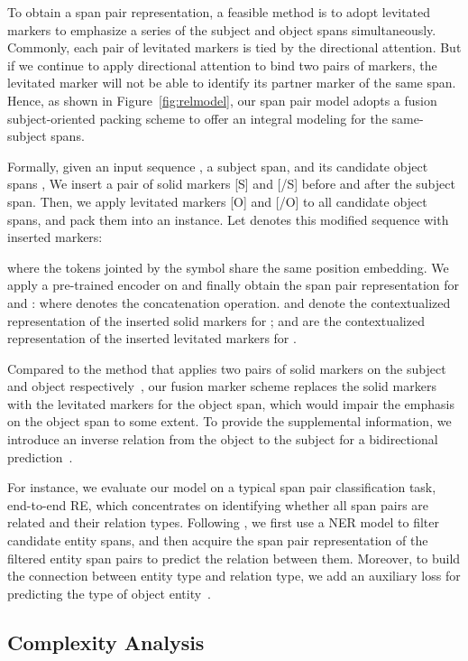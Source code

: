 \documentclass[11pt]{article}
\begin{document}
To obtain a span pair representation, a feasible method is to adopt levitated markers to emphasize a series of the subject and object spans simultaneously. Commonly, each pair of levitated markers is tied by the directional attention. But if we continue to apply directional attention to bind two pairs of markers,  the levitated marker will not be able to identify its partner marker of the same span. Hence, as shown in Figure~\ref{fig:relmodel}, our span pair model adopts a fusion subject-oriented packing scheme to offer an integral modeling for the same-subject spans. 

Formally, given an input sequence , a subject span,  and its candidate object spans , We insert a pair of solid markers [S] and [/S]  before and after the subject span. 
Then, we apply levitated markers [O] and [/O] to all candidate object spans, and  pack them into an instance. Let  denotes this   modified sequence  with  inserted markers:

where the tokens jointed by the symbol  share the same position embedding. We apply a pre-trained encoder on  and finally obtain the span pair representation for  and :
where  denotes the concatenation operation.   and  denote the contextualized representation of the inserted solid markers for ;  and  are the contextualized representation of the inserted levitated markers for . 


Compared to the method that applies two pairs of solid markers on the subject  and object   respectively~\cite{PURE}, our fusion marker scheme replaces the  solid markers with the levitated markers for the object span, which would impair the emphasis  on the object span to some extent. To provide the supplemental information, we  introduce an inverse relation from the object  to the subject  for a bidirectional prediction~\cite{corefqa}.


For instance, we evaluate our model on a typical span pair classification task, end-to-end RE, which concentrates on identifying whether all span pairs are related and their relation types. Following \citet{PURE}, we first use a NER model to filter candidate entity spans, and then acquire the span pair representation of the filtered entity span pairs to predict the relation between them. Moreover, to build the connection between entity type and relation type, we add an auxiliary loss for predicting the type of object entity~\cite{Typemarker, PTR}.




\subsection{Complexity Analysis}
\end{document}
